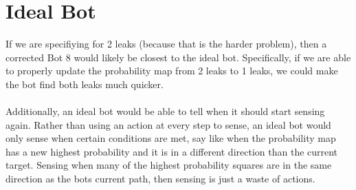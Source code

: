 \documentclass[12pt]{article}
\begin{document}
\section*{Ideal Bot}
If we are specifiying for 2 leaks (because that is the harder problem), then a corrected Bot 8 would 
likely be closest to the ideal bot. Specifically, if we are able to properly update the probability map from 
2 leaks to 1 leaks, we could make the bot find both leaks much quicker. 
\\
\\
Additionally, an ideal bot would be able to tell when it should start sensing again. Rather than using an 
action at every step to sense, an ideal bot would only sense when certain conditions are met, say like when 
the probability map has a new highest probability and it is in a different direction than the current target. 
Sensing when many of the highest probability squares are in the same direction as the bots current path, 
then sensing is just a waste of actions. 
\end{document}
